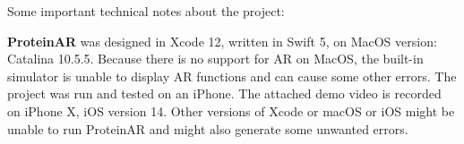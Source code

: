 Some important technical notes about the project:

\textbf{ProteinAR} was designed in Xcode 12, written in Swift 5, on MacOS version: Catalina 10.5.5. Because there is no support for AR on MacOS, the built-in simulator is unable to display AR functions and can cause some other errors. The project was run and tested on an iPhone. The attached demo video is recorded on iPhone X, iOS version 14. Other versions of Xcode or macOS or iOS might be unable to run ProteinAR and might also generate some unwanted errors. 

